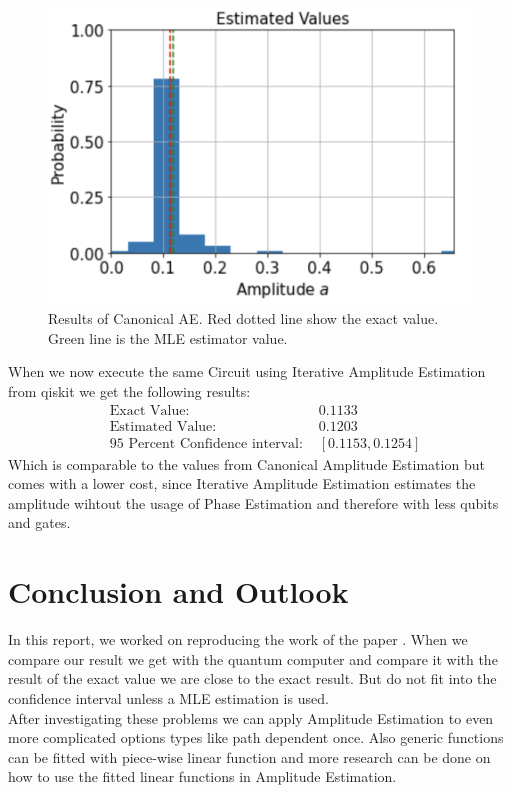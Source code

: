 \documentclass[a4paper, 12pt, one column, aas_macros]{article}
\begin{document}
 \begin{figure}[H]
  \begin{center}
    \includegraphics[width=\linewidth]{images/resultAE.png}
  \end{center}
  \caption{Results of Canonical AE. Red dotted line show the exact value. Green line is the MLE estimator value. }
  \label{fig:resultAE}
\end{figure}
When we now execute the same Circuit using Iterative Amplitude Estimation \cite{Grinko_2021} from qiskit we get the following results:
\begin{align}
    &\text{Exact Value: } &0.1133\\
    &\text{Estimated Value: } &0.1203\\
    &\text{95 Percent Confidence interval:	} &[0.1153, 0.1254]
\end{align}
Which is comparable to the values from Canonical Amplitude Estimation but comes with a lower cost, since Iterative Amplitude Estimation estimates the amplitude wihtout the usage of Phase Estimation and therefore with less qubits and gates.
\section{Conclusion and Outlook}
In this report, we worked on reproducing the work of the paper \cite{1905.02666}. When we compare our result we get with the quantum computer and compare it with the result of the exact value we are  close to the exact result. But do not fit into the confidence interval unless a MLE estimation is used.\\
After investigating these problems we can apply Amplitude Estimation to even more complicated options types like path dependent once. Also generic functions can be fitted with piece-wise linear function and more research can be done on how to use the fitted linear functions in Amplitude Estimation. 

\end{document}
